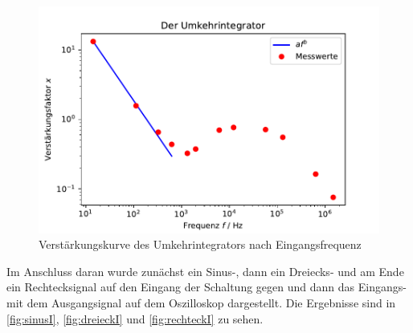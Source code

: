 \begin{figure}
    \centering
    \includegraphics{content/grafiken/umkehrintegrator.pdf}
    \caption{Verstärkungskurve des Umkehrintegrators nach Eingangsfrequenz}
    \label{fig:umkehrintegrator}
  \end{figure}
Im Anschluss daran wurde zunächst ein Sinus-, dann ein Dreiecks- und am Ende ein Rechtecksignal
auf den Eingang der Schaltung gegen und dann das Eingangs- mit dem Ausgangsignal auf dem Oszilloskop 
dargestellt. Die Ergebnisse sind in \autoref{fig:sinusI}, \autoref{fig:dreieckI} und \autoref{fig:rechteckI}
zu sehen.

